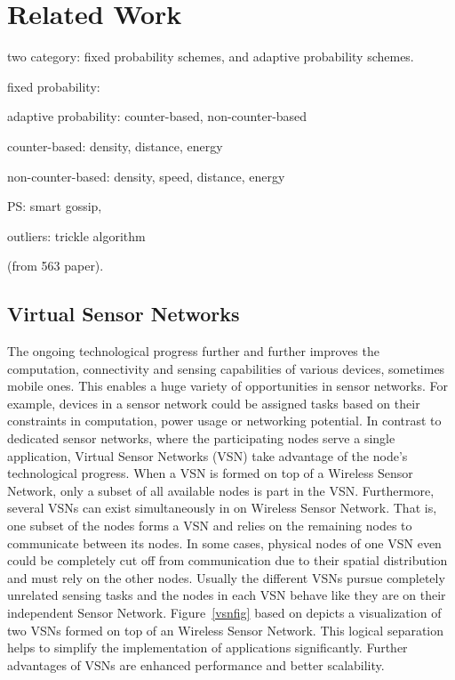 \chapter{Related Work}
\label{Chapter2}

two category: fixed probability schemes, and adaptive probability schemes.

fixed probability: 

adaptive probability: counter-based, non-counter-based

counter-based: density, distance, energy
 
non-counter-based: density, speed, distance, energy

PS: smart gossip, 

outliers: trickle algorithm




(from 563 paper).

\section{Virtual Sensor Networks}
The ongoing technological progress further and further improves the computation, connectivity and sensing capabilities of various devices, sometimes mobile ones. \cite{Jayasumana} This enables a huge variety of opportunities in sensor networks. For example, devices in a sensor network could be assigned tasks based on their constraints in computation, power usage or networking potential. In contrast to dedicated sensor networks, where the participating nodes serve a single application, Virtual Sensor Networks (VSN) take advantage of the node’s technological progress. When a VSN is formed on top of a Wireless Sensor Network, only a subset of all available nodes is part in the VSN. Furthermore, several VSNs can exist simultaneously in on Wireless Sensor Network. \cite{Jayasumana} That is, one subset of the nodes forms a VSN and relies on the remaining nodes to communicate between its nodes. In some cases, physical nodes of one VSN even could be completely cut off from communication due to their spatial distribution and must rely on the other nodes. Usually the different VSNs pursue completely unrelated sensing tasks and the nodes in each VSN behave like they are on their independent Sensor Network. Figure~\ref{vsnfig} based on \cite{Jayasumana} depicts a visualization of two VSNs formed on top of an Wireless Sensor Network. This logical separation helps to simplify the implementation of applications significantly. \cite{Jayasumana} Further advantages of VSNs are enhanced performance and better scalability.

